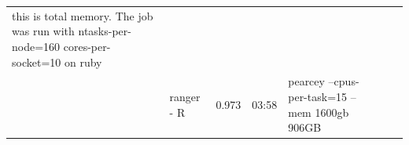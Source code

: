 \documentclass[10pt,letterpaper]{article}
\begin{document}
\begin{table}[!ht]
\begin{minipage}{\textwidth}
\begin{adjustwidth}{-2.25in}{0in}
\begin{tabular}{|l|l|l|l|l|l|p{1cm}|}
{                                                                                                                                           this
                                                                                                                                           is
                                                                                                                                           total
                                                                                                                                           memory. The
                                                                                                                                           job
                                                                                                                                           was
                                                                                                                                           run
                                                                                                                                           with
                                                                                                                                                   ntasks-per-node=160
                                                                                                                                           cores-per-socket=10
                                                                                                                                           on
                                                                                                                                           ruby
                                                                                                                                           }  \\
& ranger - R        &             0.973     &      03:58           &       pearcey --cpus-per-task=15 --mem 1600gb   906GB \\
\hline


\end{tabular}
\end{adjustwidth}
\end{minipage}
\end{table}
\end{document}
